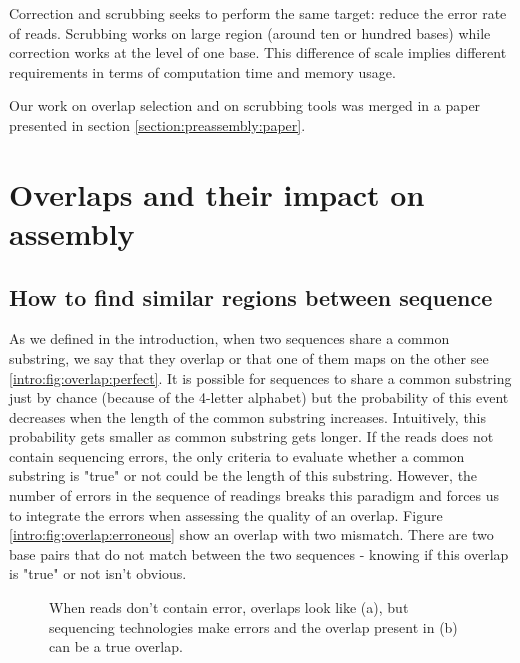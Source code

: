 \documentclass[main.tex]{subfiles}
\begin{document}
Correction and scrubbing seeks to perform the same target: reduce the error rate of reads. Scrubbing works on large region (around ten or hundred bases) while correction works at the level of one base. This difference of scale implies different requirements in terms of computation time and memory usage.

Our work on overlap selection and on scrubbing tools was merged in a paper presented in section \ref{section:preassembly:paper}.

\section{Overlaps and their impact on assembly}

\subsection{How to find similar regions between sequence} \label{sec:preasm:ovl}

As we defined in the introduction, when two sequences share a common substring, we say that they overlap or that one of them maps on the other see \ref{intro:fig:overlap:perfect}. It is possible for sequences to share a common substring just by chance (because of the 4-letter alphabet) but the probability of this event decreases when the length of the common substring increases. Intuitively, this probability gets smaller as common substring gets longer. If the reads does not contain sequencing errors, the only criteria to evaluate whether a common substring is "true" or not could be the length of this substring. However, the number of errors in the sequence of readings breaks this paradigm and forces us to integrate the errors when assessing the quality of an overlap. Figure \ref{intro:fig:overlap:erroneous} show an overlap with two mismatch. There are two base pairs that do not match between the two sequences - knowing if this overlap is "true" or not isn't obvious.


\begin{figure}[ht]
    \centering
    \caption{When reads don't contain error, overlaps look like (a), but sequencing technologies make errors and the overlap present in (b) can be a true overlap.}
    \label{intro:fig:overlap}
\end{figure}
\end{document}
